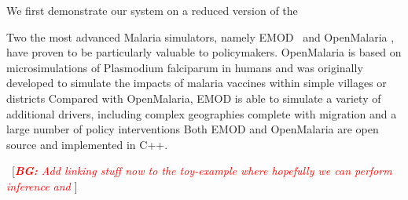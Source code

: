 \documentclass{article}
\newcommand{\bg}[1]{~{{[{\it \textcolor{red}{{\bf BG:} #1}}]}}}
\begin{document}
We first demonstrate our system on a reduced version of the 

Two the most advanced Malaria simulators, namely EMOD~\cite{bershteyn2018implementation} and OpenMalaria  \cite{smith2008towards}, have proven to be particularly valuable to policymakers.
OpenMalaria is based on microsimulations of Plasmodium falciparum in humans and was originally developed to simulate the impacts of malaria vaccines within simple villages or districts
Compared with OpenMalaria, EMOD is able to simulate a variety of additional drivers, including complex geographies complete with migration and a large number of policy interventions
Both EMOD and OpenMalaria are open source and implemented in C++.

\bg{Add linking stuff now to the toy-example where hopefully we can perform inference and }






%


\end{document}
